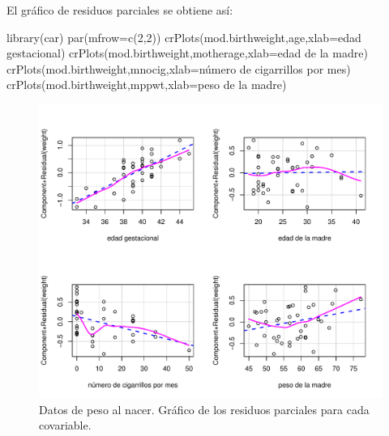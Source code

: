 \documentclass[
]{article}
\newenvironment{Shaded}{\begin{snugshade}}{\end{snugshade}}
\newcommand{\AttributeTok}[1]{\textcolor[rgb]{0.77,0.63,0.00}{#1}}
\newcommand{\DecValTok}[1]{\textcolor[rgb]{0.00,0.00,0.81}{#1}}
\newcommand{\FunctionTok}[1]{\textcolor[rgb]{0.00,0.00,0.00}{#1}}
\newcommand{\NormalTok}[1]{#1}
\newcommand{\StringTok}[1]{\textcolor[rgb]{0.31,0.60,0.02}{#1}}
\begin{document}
El gráfico de residuos parciales se obtiene así:

\begin{Shaded}
\begin{Highlighting}[]
\FunctionTok{library}\NormalTok{(car)}
\FunctionTok{par}\NormalTok{(}\AttributeTok{mfrow=}\FunctionTok{c}\NormalTok{(}\DecValTok{2}\NormalTok{,}\DecValTok{2}\NormalTok{))}
\FunctionTok{crPlots}\NormalTok{(mod.birthweight,}\StringTok{\textquotesingle{}age\textquotesingle{}}\NormalTok{,}\AttributeTok{xlab=}\StringTok{\textquotesingle{}edad gestacional\textquotesingle{}}\NormalTok{)}
\FunctionTok{crPlots}\NormalTok{(mod.birthweight,}\StringTok{\textquotesingle{}motherage\textquotesingle{}}\NormalTok{,}\AttributeTok{xlab=}\StringTok{\textquotesingle{}edad de la madre\textquotesingle{}}\NormalTok{)}
\FunctionTok{crPlots}\NormalTok{(mod.birthweight,}\StringTok{\textquotesingle{}mnocig\textquotesingle{}}\NormalTok{,}\AttributeTok{xlab=}\StringTok{\textquotesingle{}número de cigarrillos por mes\textquotesingle{}}\NormalTok{)}
\FunctionTok{crPlots}\NormalTok{(mod.birthweight,}\StringTok{\textquotesingle{}mppwt\textquotesingle{}}\NormalTok{,}\AttributeTok{xlab=}\StringTok{\textquotesingle{}peso de la madre\textquotesingle{}}\NormalTok{)}
\end{Highlighting}
\end{Shaded}

\begin{figure}

{\centering \includegraphics{MLGI_files/figure-latex/residuosBWdata2-1} 

}

\caption{Datos de peso al nacer. Gráfico de los residuos parciales para cada covariable.}\label{fig:residuosBWdata2}
\end{figure}
\end{document}
